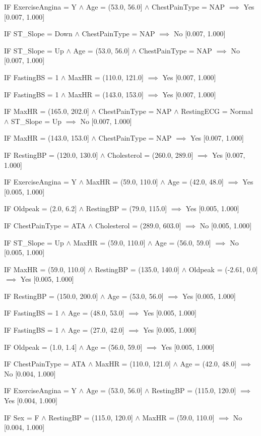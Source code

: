 IF ExerciseAngina = Y $\land$ Age = (53.0, 56.0] $\land$ ChestPainType = NAP $\implies$ Yes [0.007, 1.000]

IF ST_Slope = Down $\land$ ChestPainType = NAP $\implies$ No [0.007, 1.000]

IF ST_Slope = Up $\land$ Age = (53.0, 56.0] $\land$ ChestPainType = NAP $\implies$ No [0.007, 1.000]

IF FastingBS = 1 $\land$ MaxHR = (110.0, 121.0] $\implies$ Yes [0.007, 1.000]

IF FastingBS = 1 $\land$ MaxHR = (143.0, 153.0] $\implies$ Yes [0.007, 1.000]

IF MaxHR = (165.0, 202.0] $\land$ ChestPainType = NAP $\land$ RestingECG = Normal $\land$ ST_Slope = Up $\implies$ No [0.007, 1.000]

IF MaxHR = (143.0, 153.0] $\land$ ChestPainType = NAP $\implies$ Yes [0.007, 1.000]

IF RestingBP = (120.0, 130.0] $\land$ Cholesterol = (260.0, 289.0] $\implies$ Yes [0.007, 1.000]

IF ExerciseAngina = Y $\land$ MaxHR = (59.0, 110.0] $\land$ Age = (42.0, 48.0] $\implies$ Yes [0.005, 1.000]

IF Oldpeak = (2.0, 6.2] $\land$ RestingBP = (79.0, 115.0] $\implies$ Yes [0.005, 1.000]

IF ChestPainType = ATA $\land$ Cholesterol = (289.0, 603.0] $\implies$ No [0.005, 1.000]

IF ST_Slope = Up $\land$ MaxHR = (59.0, 110.0] $\land$ Age = (56.0, 59.0] $\implies$ No [0.005, 1.000]

IF MaxHR = (59.0, 110.0] $\land$ RestingBP = (135.0, 140.0] $\land$ Oldpeak = (-2.61, 0.0] $\implies$ Yes [0.005, 1.000]

IF RestingBP = (150.0, 200.0] $\land$ Age = (53.0, 56.0] $\implies$ Yes [0.005, 1.000]

IF FastingBS = 1 $\land$ Age = (48.0, 53.0] $\implies$ Yes [0.005, 1.000]

IF FastingBS = 1 $\land$ Age = (27.0, 42.0] $\implies$ Yes [0.005, 1.000]

IF Oldpeak = (1.0, 1.4] $\land$ Age = (56.0, 59.0] $\implies$ Yes [0.005, 1.000]

IF ChestPainType = ATA $\land$ MaxHR = (110.0, 121.0] $\land$ Age = (42.0, 48.0] $\implies$ No [0.004, 1.000]

IF ExerciseAngina = Y $\land$ Age = (53.0, 56.0] $\land$ RestingBP = (115.0, 120.0] $\implies$ Yes [0.004, 1.000]

IF Sex = F $\land$ RestingBP = (115.0, 120.0] $\land$ MaxHR = (59.0, 110.0] $\implies$ No [0.004, 1.000]

